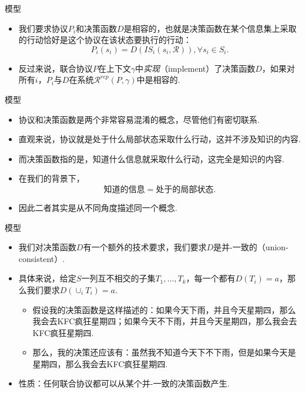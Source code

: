 \begin{frame}{模型}
\begin{itemize}
    \item 我们要求协议$P_i$和决策函数$D$是相容的，也就是决策函数在某个信息集上采取的行动恰好是这个协议在该状态要执行的行动：
    \[P_i(s_i)=D(IS_i(s_i,\mathcal R)),\forall s_i\in S_i.\]
    \item 反过来说，联合协议$P$在上下文$\gamma$中\emph{实现}（implement）了决策函数$D$，如果对所有$i$，$P_i$与$D$在系统$\mathcal R^{rep}(P,\gamma)$中是相容的.
\end{itemize}
\end{frame}

\begin{frame}{模型}
\begin{itemize}
    \item 协议和决策函数是两个非常容易混淆的概念，尽管他们有密切联系.
    \item 直观来说，协议就是处于什么局部状态采取什么行动，这并不涉及知识的内容.
    \item 而决策函数指的是，知道什么信息就采取什么行动，这完全是知识的内容.
    \item 在我们的背景下，
    \[\text{知道的信息}=\text{处于的局部状态}.\]
    \item 因此二者其实是从不同角度描述同一个概念.
\end{itemize}
\end{frame}

\begin{frame}{模型}
\begin{itemize}
    \item 我们对决策函数$D$有一个额外的技术要求，我们要求$D$是并-一致的（union-consistent）.
    \item 具体来说，给定$S$一列互不相交的子集$T_1,\dots,T_k$，每一个都有$D(T_i)=a$，那么我们要求$D(\cup_i T_i)=a$.
    \begin{itemize}
        \item 假设我的决策函数是这样描述的：如果今天下雨，并且今天星期四，那么我会去KFC疯狂星期四；如果今天不下雨，并且今天星期四，那么我会去KFC疯狂星期四.
        \item 那么，我的决策还应该有：虽然我不知道今天下不下雨，但是如果今天是星期四，那么我会去KFC疯狂星期四.
    \end{itemize}
    \item 性质：任何联合协议都可以从某个并-一致的决策函数产生.
\end{itemize}
\end{frame}

